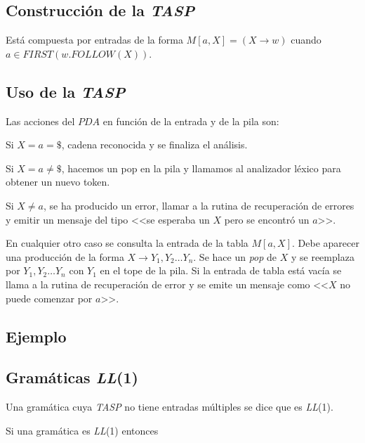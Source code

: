 \subsection{Construcción de la \textit{TASP}}

Está compuesta por entradas de la forma $M[a,X]=(X\rightarrow w)$        cuando 
          $a\in FIRST(w.FOLLOW(X))$.

 
\subsection{Uso de la \textit{TASP}}

Las acciones del $PDA$ en función de la entrada y de
la pila son:

  Si $X=a=\$$, cadena reconocida y se finaliza el análisis.
  
  Si $X=a\neq \$$, hacemos un pop en la pila y llamamos al analizador léxico para obtener un nuevo token.
  
  Si $X\neq a$, se ha producido un error, llamar a la rutina de recuperación de errores y emitir un mensaje del tipo <<se esperaba un $X$ pero se encontró un $ a $>>.
  
  En cualquier otro caso se consulta la entrada de la tabla $M[a,X]$. Debe aparecer una producción de la forma $ X\rightarrow Y_{1},Y_{2}\ldots  Y_{n}$. Se hace un \textit{pop} de $ X$ y se reemplaza por $Y_{1},Y_{2}\ldots Y_{n}$ con $Y_{1}$ en el tope de la pila.
Si la entrada de tabla está vacía se llama a la rutina de recuperación de error y se emite un mensaje como <<$X$ no puede comenzar por $a$>>.

\subsection{Ejemplo}





\subsection{Gramáticas \textit{LL}(1)}

Una gramática cuya \textit{TASP} no tiene entradas múltiples se dice que es \textit{LL}(1).

Si una gramática es \textit{LL}(1) entonces 

